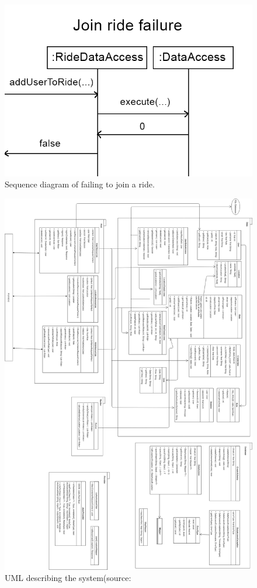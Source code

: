 \documentclass{article}
\begin{document}
\begin{figure}[h]
  \centering
  \includegraphics[scale=0.3]{seqdiagram9.png}
  \caption{Sequence diagram of failing to join a ride.}
  \label{fig:seq9}
\end{figure}

\newpage
\begin{figure}[h]
  \includegraphics[scale=0.37]{UML.png}
  \caption{UML describing the system(source: }
  \label{fig:uml}
\end{figure}
\end{document}
